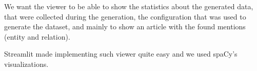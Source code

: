 We want the viewer to be able to show the statistics about the generated data, that were collected during the generation, the configuration that was used to generate the dataset, and mainly to show an article with the found mentions (entity and relation). 

Streamlit made implementing such viewer quite easy and we used spaCy’s  visualizations. 


















